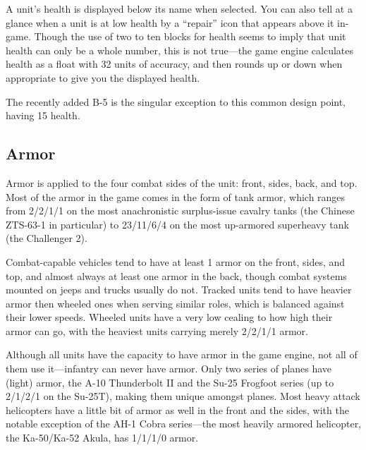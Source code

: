 \documentclass{article}
\begin{document}
A unit's health is displayed below its name when selected. You can also tell at
a glance when a unit is at low health by a ``repair'' icon that appears above it
in-game. Though the use of two to ten blocks for health seems to imply that unit
health can only be a whole number, this is not true---the game engine
calculates health as a float with 32 units of accuracy, and then rounds up or
down when appropriate to give you the displayed health.

The recently added B-5 is the singular exception to this common design point,
having 15 health.

\subsection{Armor}

Armor is applied to the four combat sides of the unit: front, sides, back, and
top. Most of the armor in the game comes in the form of tank armor, which ranges
from 2/2/1/1 on the most anachronistic surplus-issue cavalry tanks (the Chinese
ZTS-63-1 in particular) to 23/11/6/4 on the most up-armored superheavy tank (the
Challenger 2).

Combat-capable vehicles tend to have at least 1 armor on the front, sides, and
top, and almost always at least one armor in the back, though combat systems
mounted on jeeps and trucks usually do not. Tracked units tend to have heavier
armor then wheeled ones when serving similar roles, which is balanced against
their lower speeds. Wheeled units have a very low cealing to how high their
armor can go, with the heaviest units carrying merely 2/2/1/1 armor.

Although all units have the capacity to have armor in the game engine,
not all of them use it---infantry can never have armor. Only two series of
planes have (light) armor, the A-10 Thunderbolt II and the Su-25 Frogfoot
series (up to 2/1/2/1 on the Su-25T), making them unique amongst planes. Most
heavy attack helicopters have a little bit of armor as well in the front and
the sides, with the notable exception of the AH-1 Cobra series---the most
heavily armored helicopter, the Ka-50/Ka-52 Akula, has 1/1/1/0 armor.
\end{document}
